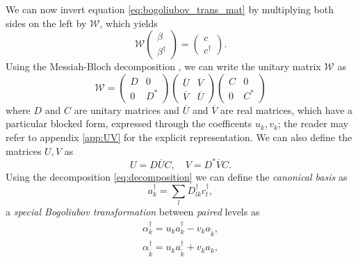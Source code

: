 We can now invert equation \eqref{eq:bogoliubov_trans_mat} by multiplying both sides on the left by $\mathcal W$, which yields 
\begin{equation*}
    \mathcal W \begin{pmatrix}
        \beta\\
        \beta^\dagger
    \end{pmatrix}
    =\begin{pmatrix}
        c\\
        c^\dagger
    \end{pmatrix}.
\end{equation*}
Using the Messiah-Bloch decomposition \cite{blochmessiah}, we can write the unitary matrix $\mathcal W$ as
\begin{equation}
    \label{eq:decomposition}
    \mathcal W = \begin{pmatrix}
        D & 0 \\
        0 & D^*
    \end{pmatrix}
    \begin{pmatrix}
        \overline U & \overline V \\
        \overline V & \overline U
    \end{pmatrix}
    \begin{pmatrix}
        C & 0 \\
        0 & C^*
    \end{pmatrix}
\end{equation}
where $D$ and $C$ are unitary matrices and $\overline U$ and $\overline V$ are real matrices, which have a particular blocked form, expressed through the coefficents $u_k, v_k$; the reader may refer to appendix \ref{app:UV} for the explicit representation. We can also define the matrices $U, V$ as 
\begin{equation}
    U=D\overline U C,\quad V=D^*\overline V C.
\end{equation}
Using the decomposition \eqref{eq:decomposition} we can define the \textit{canonical basis} as
\begin{equation}
    \label{eq:canonical_basis}
    a_k^\dagger = \sum_l D_{lk}^\dagger c_l^\dagger,
\end{equation}
a \textit{special Bogoliubov transformation} between \textit{paired} levels as
\begin{align}
    \alpha_k^\dagger = u_k a_k^\dagger - v_k a_{\tilde k},\\
    \alpha_{\tilde k } ^\dagger = u_k a_{\tilde k} ^\dagger + v_k a_k,
\end{align}
